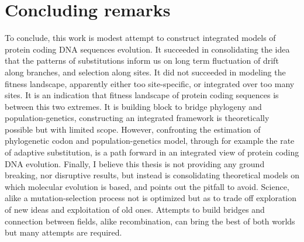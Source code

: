 \section{Concluding remarks}
\label{sec:concluding-remarks}

To conclude, this work is modest attempt to construct integrated models of protein coding \acrshort{DNA} sequences evolution.
It succeeded in consolidating the idea that the patterns of \glspl{substitution} inform us on long term fluctuation of drift along branches, and selection along sites.
It did not succeeded in modeling the fitness landscape, apparently either too site-specific, or integrated over too many sites.
It is an indication that fitness landscape of protein coding sequences is between this two extremes.
It is building block to bridge phylogeny and population-genetics, constructing an integrated framework is theoretically possible but with limited scope.
However, confronting the estimation of phylogenetic \gls{codon} and population-genetics model, through for example the rate of adaptive \gls{substitution}, is a path forward in an integrated view of protein coding DNA evolution.
Finally, I believe this thesis is not providing any ground breaking, nor disruptive results, but instead is consolidating theoretical models on which molecular evolution is based, and points out the pitfall to avoid.
Science, alike a mutation-selection process not is optimized but as to trade off exploration of new ideas and exploitation of old ones.
Attempts to build bridges and connection between fields, alike \gls{recombination}, can bring the best of both worlds but many attempts are required.